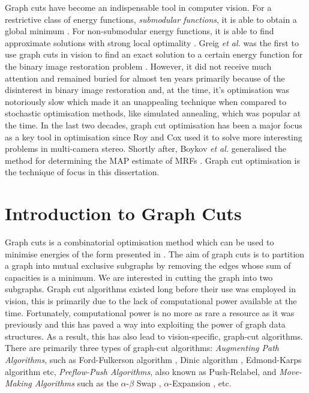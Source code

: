 \begin{definition}
	Graph cuts have become an indispensable tool in computer vision.
	For a restrictive class of energy functions, \textit{submodular functions}, it is able to obtain a global minimum \citep{Kolmogorov2004,Boykov2001_2,Boykvo2001_3,Kolmogorov2007}.
	For non-submodular energy functions, it is able to find approximate solutions with strong local optimality \citep{Boykov2001,Kohli2009,Komodakis2007,Kumar2009}.
	Greig \textit{et al.} was the first to use graph cuts in vision to find an exact solution to a certain energy function for the binary image restoration problem \citep{Greig1989}.
	However, it did not receive much attention and remained buried for almost ten years primarily because of the disinterest in binary image restoration and, at the time, it's optimisation was notoriously slow which made it an unappealing technique when compared to stochastic optimisation methods, like simulated annealing, which was popular at the time.
	In the last two decades, graph cut optimisation has been a major focus as a key tool in optimisation since Roy and Cox \citep{Roy1998} used it to solve more interesting problems in multi-camera stereo.
	Shortly after, Boykov \textit{et al.} generalised the method for determining the MAP estimate of MRFs \citep{Boykov1998}.
	Graph cut optimisation is the technique of focus in this dissertation.
\end{definition}
  

\section{Introduction to Graph Cuts}
\label{sec:GraphCuts}

Graph cuts is a combinatorial optimisation method which can be used to minimise energies of the form presented in . The aim of graph cuts is to partition a graph into mutual exclusive subgraphs by removing the edges whose sum of capacities is a minimum. We are interested in cutting the graph into two subgraphs. Graph cut algorithms existed long before their use was employed in vision, this is primarily due to the lack of computational power available at the time. Fortunately, computational power is no more as rare a resource as it was previously and this has paved a way into exploiting the power of graph data structures. As a result, this has also lead to vision-specific, graph-cut algorithms. There are primarily three types of graph-cut algorithms: \textit{Augmenting Path Algorithms}, such as Ford-Fulkerson algorithm \citep{Ford1956}, Dinic algorithm \citep{Dinic1970}, Edmond-Karps algorithm \citep{Edmonds1972} etc, \textit{Preflow-Push Algorithms}, also known as Push-Relabel\citep{Goldberg1988}, and \textit{Move-Making Algorithms} such as the $\alpha$-$\beta$ Swap \citep{Boykov2001}, $\alpha$-Expansion \citep{Boykov2001}, etc.

